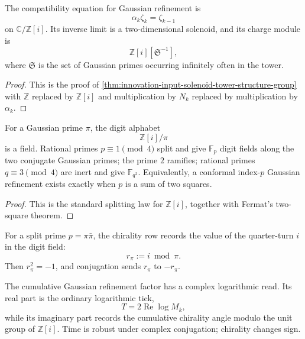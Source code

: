 \begin{theorem}
\label{thm:innovation-input-modular-gaussian-solenoid-row}
The compatibility equation for Gaussian refinement is
$$
\alpha_k\zeta_k=\zeta_{k-1}
$$
on $\mathbb C/\mathbb Z[i]$. Its inverse limit is a two-dimensional
solenoid, and its charge module is
$$
\mathbb Z[i][\mathfrak S^{-1}],
$$
where $\mathfrak S$ is the set of Gaussian primes occurring infinitely
often in the tower.
\end{theorem}

\begin{proof}
This is the proof of
\autoref{thm:innovation-input-solenoid-tower-structure-group} with
$\mathbb Z$ replaced by $\mathbb Z[i]$ and multiplication by $N_k$
replaced by multiplication by $\alpha_k$.
\end{proof}

\begin{theorem}
\label{thm:innovation-input-modular-digit-field-fermat}
For a Gaussian prime $\pi$, the digit alphabet
$$
\mathbb Z[i]/\pi
$$
is a field. Rational primes $p\equiv 1\pmod{4}$ split and give
$\mathbb F_p$ digit fields along the two conjugate Gaussian primes; the
prime $2$ ramifies; rational primes $q\equiv 3\pmod{4}$ are inert and give
$\mathbb F_{q^2}$. Equivalently, a conformal index-$p$ Gaussian refinement
exists exactly when $p$ is a sum of two squares.
\end{theorem}

\begin{proof}
This is the standard splitting law for $\mathbb Z[i]$, together with
Fermat's two-square theorem.
\end{proof}

\begin{definition}
\label{def:innovation-input-modular-chirality-row}
For a split prime $p=\pi\bar\pi$, the chirality row records the value of
the quarter-turn $i$ in the digit field:
$$
r_\pi:=i\bmod\pi.
$$
Then $r_\pi^2=-1$, and conjugation sends $r_\pi$ to $-r_\pi$.
\end{definition}

\begin{principle}
\label{prin:innovation-input-modular-complex-log-ledger}
The cumulative Gaussian refinement factor has a complex logarithmic read.
Its real part is the ordinary logarithmic tick,
$$
T=2\operatorname{Re}\log M_k,
$$
while its imaginary part records the cumulative chirality angle modulo the
unit group of $\mathbb Z[i]$. Time is robust under complex conjugation;
chirality changes sign.
\end{principle}

